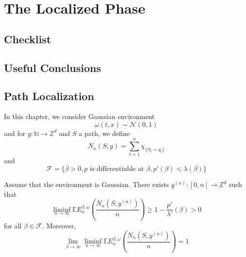 \section{The Localized Phase}

\subsection{Checklist}

\subsection{Useful Conclusions}

\subsection{Path Localization}

\begin{definition}
    In this chapter, we consider Gaussian environment
    \[
    \omega(t,x) \sim \mathcal{N}(0,1)
    \]
    and for $y:\mathbb{N}\to\mathbb{Z}^d$ and $S$ a path, we define
    \[
    N_n(S,y) = \sum\limits_{t=1}^n \chi_{\{S_t = y_t\}}
    \]
    and
    \[\mathcal{F} = \{\beta > 0, p\text{ is differentiable at }\beta,p'(\beta) < \lambda(\beta)\}\]
\end{definition}

\begin{theorem}
    Assume that the environment is Gaussian. There exists $y^{(n)}:[0,n] \to\mathbb{Z}^d$ such that
    \[
    \liminf_{n\to\infty} \mathbb{E}E_n^{\beta,\omega}\left(\dfrac{N_n(S,y^{(n)})}{n}\right) \geq 1 - \dfrac{p'}{\lambda'}(\beta) > 0
    \]
    for all $\beta \in \mathcal{F}$. Moreover,
    \[
    \lim_{\beta\to\infty} \liminf_{n\to\infty} \mathbb{E}E_n^{\beta,\omega}\left(\dfrac{N_n(S,y^{(n)})}{n}\right) = 1
    \]
\end{theorem}